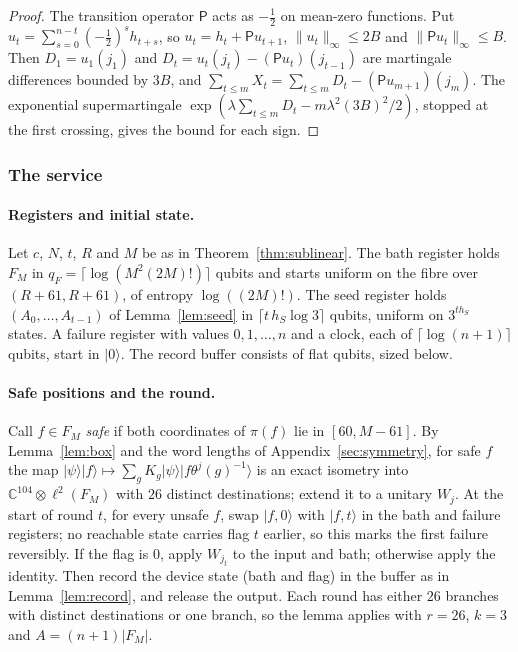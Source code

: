 \documentclass[11pt,a4paper]{article}
\theoremstyle{plain}
\theoremstyle{definition}
\theoremstyle{remark}
\begin{document}
\begin{proof}
The transition operator $\mathsf P$ acts as $-\frac12$ on mean-zero functions. Put $u_t=\sum_{s=0}^{n-t}(-\frac12)^sh_{t+s}$, so
$u_t=h_t+\mathsf Pu_{t+1}$, $\|u_t\|_\infty\le2B$ and $\|\mathsf Pu_t\|_\infty\le B$. Then $D_1=u_1(j_1)$ and
$D_t=u_t(j_t)-(\mathsf Pu_t)(j_{t-1})$ are martingale differences bounded by $3B$, and
$\sum_{t\le m}X_t=\sum_{t\le m}D_t-(\mathsf Pu_{m+1})(j_m)$. The exponential supermartingale
$\exp(\lambda\sum_{t\le m}D_t-m\lambda^2(3B)^2/2)$, stopped at the first crossing, gives the bound for each sign.
\end{proof}

\subsubsection{The service}

\paragraph{Registers and initial state.} Let $c$, $N$, $t$, $R$ and $M$ be as in Theorem~\ref{thm:sublinear}. The bath register holds $F_M$ in $q_F=\lceil\log(M^2(2M)!)\rceil$
qubits and starts uniform on the fibre over $(R+61,R+61)$, of entropy $\log((2M)!)$. The seed register holds
$(A_0,\dots,A_{t-1})$ of Lemma~\ref{lem:seed} in $\lceil t\,h_S\log3\rceil$ qubits, uniform on $3^{t h_S}$ states. A failure register with values
$0,1,\dots,n$ and a clock, each of $\lceil\log(n+1)\rceil$ qubits, start in $|0\rangle$. The record buffer consists of flat
qubits, sized below.

\paragraph{Safe positions and the round.} Call $f\in F_M$ \emph{safe} if both coordinates of $\pi(f)$ lie in $[60,M-61]$.
By Lemma~\ref{lem:box} and the word lengths of Appendix~\ref{sec:symmetry}, for safe $f$ the map
$|\psi\rangle|f\rangle\mapsto\sum_gK_g|\psi\rangle|f\theta^j(g)^{-1}\rangle$ is an exact isometry into $\mathbb C^{104}\otimes\ell^2(F_M)$ with $26$
distinct destinations; extend it to a unitary $W_j$. At the start of round $t$, for every unsafe $f$, swap $|f,0\rangle$ with
$|f,t\rangle$ in the bath and failure registers; no reachable state carries flag $t$ earlier, so this marks the first
failure reversibly. If the flag is $0$, apply $W_{j_t}$ to the input and bath; otherwise apply the identity. Then record
the device state (bath and flag) in the buffer as in Lemma~\ref{lem:record}, and release the output. Each round has
either $26$ branches with distinct destinations or one branch, so the lemma applies with $r=26$, $k=3$ and
$A=(n+1)|F_M|$.
\end{document}
